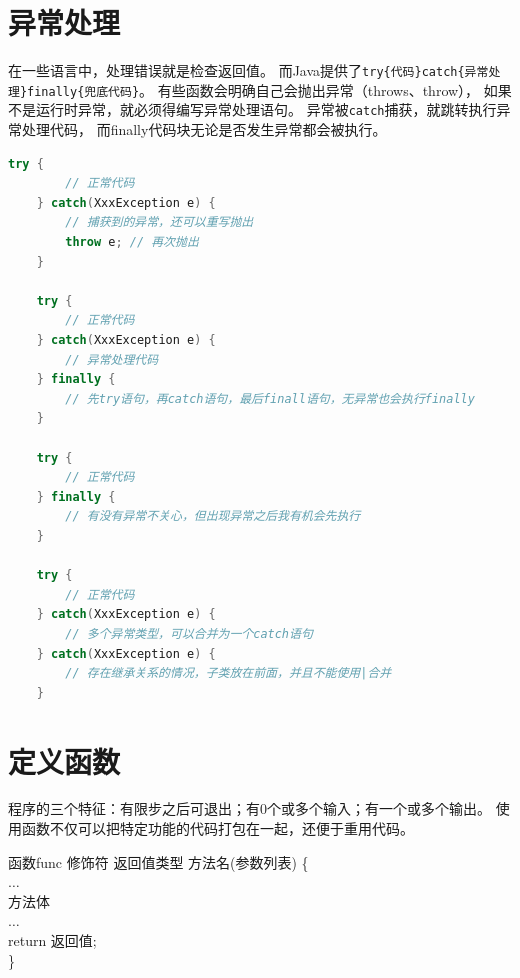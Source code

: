 \section{异常处理}
在一些语言中，处理错误就是检查返回值。
而Java提供了\lstinline!try{代码}catch{异常处理}finally{兜底代码}!。
有些函数会明确自己会抛出异常（throws、throw），
如果不是运行时异常，就必须得编写异常处理语句。
异常被\lstinline{catch}捕获，就跳转执行异常处理代码，
而finally代码块无论是否发生异常都会被执行。
\medskip
\begin{lstlisting}[language=Java]
	try {
		// 正常代码
	} catch(XxxException e) { 
		// 捕获到的异常，还可以重写抛出
		throw e; // 再次抛出
	}
 
	try {
		// 正常代码
	} catch(XxxException e) {
		// 异常处理代码
	} finally { 
		// 先try语句，再catch语句，最后finall语句，无异常也会执行finally
	}
 
	try {
		// 正常代码
	} finally { 
		// 有没有异常不关心，但出现异常之后我有机会先执行
	}
 
	try {
		// 正常代码
	} catch(XxxException e) { 
		// 多个异常类型，可以合并为一个catch语句
	} catch(XxxException e) { 
		// 存在继承关系的情况，子类放在前面，并且不能使用|合并
	}
 \end{lstlisting}

\section{定义函数}
程序的三个特征：有限步之后可退出；有0个或多个输入；有一个或多个输出。
使用函数不仅可以把特定功能的代码打包在一起，还便于重用代码。

\begin{definition}{函数}{func}
	修饰符 \textvisiblespace 返回值类型 \textvisiblespace 方法名(参数列表) \{ \\
  \textcolor{lightgray}{\codeident[1cm]} $\dots$ \\
  \textcolor{lightgray}{\codeident[1cm]} 方法体 \\
  \textcolor{lightgray}{\codeident[1cm]} $\dots$ \\ 
  \textcolor{lightgray}{\codeident[1cm]} return 返回值; \\
	\}
\end{definition}

